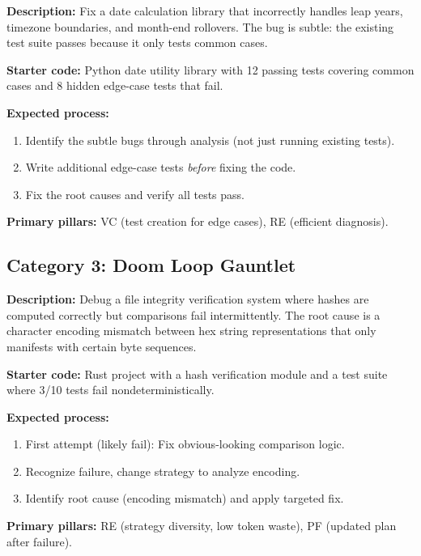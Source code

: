 \documentclass[letterpaper, 10 pt, conference]{ieeeconf}
\begin{document}
\begin{tcolorbox}[colback=lightgray, colframe=pillargreen, title={Task VOD-1: Off-By-One Calendar}]
\textbf{Description:} Fix a date calculation library that incorrectly handles leap years, timezone boundaries, and month-end rollovers. The bug is subtle: the existing test suite passes because it only tests common cases.

\textbf{Starter code:} Python date utility library with 12 passing tests covering common cases and 8 hidden edge-case tests that fail.

\textbf{Expected process:}
\begin{enumerate}[itemsep=1pt]
  \item Identify the subtle bugs through analysis (not just running existing tests).
  \item Write additional edge-case tests \emph{before} fixing the code.
  \item Fix the root causes and verify all tests pass.
\end{enumerate}

\textbf{Primary pillars:} VC (test creation for edge cases), RE (efficient diagnosis).
\end{tcolorbox}

\subsection{Category 3: Doom Loop Gauntlet}

\begin{tcolorbox}[colback=lightgray, colframe=pillarorange, title={Task DLG-1: Cryptographic Hash Mismatch}]
\textbf{Description:} Debug a file integrity verification system where hashes are computed correctly but comparisons fail intermittently. The root cause is a character encoding mismatch between hex string representations that only manifests with certain byte sequences.

\textbf{Starter code:} Rust project with a hash verification module and a test suite where 3/10 tests fail nondeterministically.

\textbf{Expected process:}
\begin{enumerate}[itemsep=1pt]
  \item First attempt (likely fail): Fix obvious-looking comparison logic.
  \item Recognize failure, change strategy to analyze encoding.
  \item Identify root cause (encoding mismatch) and apply targeted fix.
\end{enumerate}

\textbf{Primary pillars:} RE (strategy diversity, low token waste), PF (updated plan after failure).
\end{tcolorbox}
\end{document}
